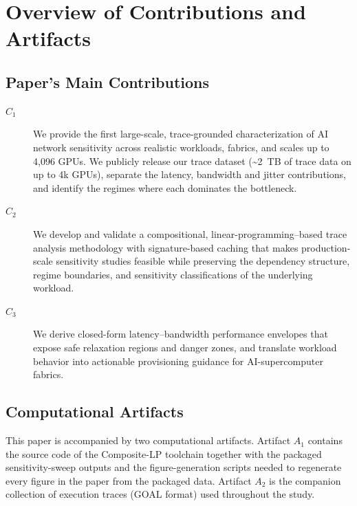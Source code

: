 \documentclass[conference]{IEEEtran}
\begin{document}


\appendixAD

\section{Overview of Contributions and Artifacts}

\subsection{Paper's Main Contributions}

\begin{description}
\item[$C_1$] We provide the first large-scale, trace-grounded
characterization of AI network sensitivity across realistic
workloads, fabrics, and scales up to 4{,}096 GPUs. We publicly
release our trace dataset (\textasciitilde2~TB of trace data on up to
4k GPUs), separate the latency, bandwidth and jitter contributions,
and identify the regimes where each dominates the bottleneck.
\item[$C_2$] We develop and validate a compositional, linear-programming--based
trace analysis methodology with signature-based caching that makes
production-scale sensitivity studies feasible while preserving the
dependency structure, regime boundaries, and sensitivity
classifications of the underlying workload.
\item[$C_3$] We derive closed-form latency--bandwidth performance
envelopes that expose safe relaxation regions and danger zones, and
translate workload behavior into actionable provisioning guidance
for AI-supercomputer fabrics.
\end{description}

\subsection{Computational Artifacts}

This paper is accompanied by two computational artifacts. Artifact
$A_1$ contains the source code of the Composite-LP toolchain together
with the packaged sensitivity-sweep outputs and the figure-generation
scripts needed to regenerate every figure in the paper from the
packaged data. Artifact $A_2$ is the companion collection of
execution traces (GOAL format) used throughout the study.
\end{document}

